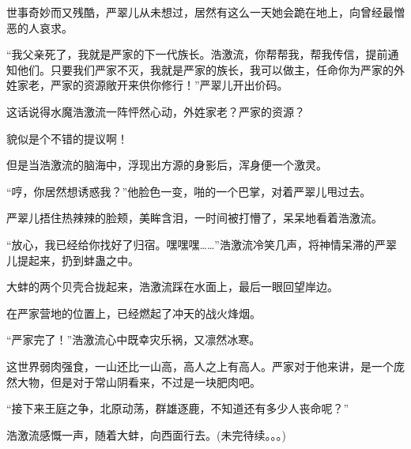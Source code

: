 \begin{this_body}
世事奇妙而又残酷，严翠儿从未想过，居然有这么一天她会跪在地上，向曾经最憎恶的人哀求。

“我父亲死了，我就是严家的下一代族长。浩激流，你帮帮我，帮我传信，提前通知他们。只要我们严家不灭，我就是严家的族长，我可以做主，任命你为严家的外姓家老，严家的资源敞开来供你修行！”严翠儿开出价码。

这话说得水魔浩激流一阵怦然心动，外姓家老？严家的资源？

貌似是个不错的提议啊！

但是当浩激流的脑海中，浮现出方源的身影后，浑身便一个激灵。

“哼，你居然想诱惑我？”他脸色一变，啪的一个巴掌，对着严翠儿甩过去。

严翠儿捂住热辣辣的脸颊，美眸含泪，一时间被打懵了，呆呆地看着浩激流。

“放心，我已经给你找好了归宿。嘿嘿嘿……”浩激流冷笑几声，将神情呆滞的严翠儿提起来，扔到蚌蛊之中。

大蚌的两个贝壳合拢起来，浩激流踩在水面上，最后一眼回望岸边。

在严家营地的位置上，已经燃起了冲天的战火烽烟。

“严家完了！”浩激流心中既幸灾乐祸，又凛然冰寒。

这世界弱肉强食，一山还比一山高，高人之上有高人。严家对于他来讲，是一个庞然大物，但是对于常山阴看来，不过是一块肥肉吧。

“接下来王庭之争，北原动荡，群雄逐鹿，不知道还有多少人丧命呢？”

浩激流感慨一声，随着大蚌，向西面行去。(未完待续。。。)

\end{this_body}

